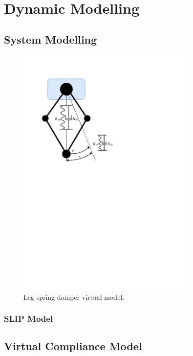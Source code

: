 \chapter{Dynamic Modelling}
\section{System Modelling}

\begin{figure}
\centering
\includegraphics[clip, trim=2cm 15cm 10cm 2cm, page = 1, width=0.8\textwidth]{images/geometry/leg-spring-damper} 
\caption{Leg spring-damper virtual model.}
\label{fig:Leg spring-damper virtual model}
\end{figure}

\subsection{SLIP Model}
\section{Virtual Compliance Model}